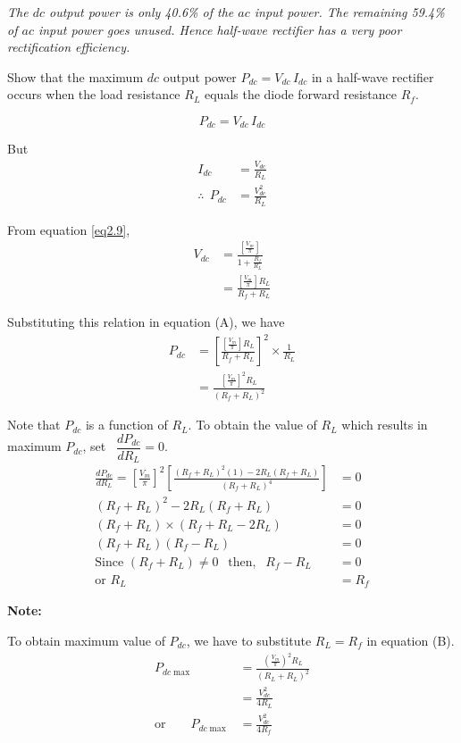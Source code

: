 {\em The $dc$ output power is only 40.6\% of the $ac$ input power. The
remaining 59.4\% of $ac$ input power goes unused. Hence half-wave
rectifier has a very poor rectification efficiency.}

\begin{example}\label{exam2.2}
Show that the maximum $dc$ output power $P_{dc} = V_{dc}\,I_{dc}$ in a
half-wave rectifier occurs when the load resistance $R_L$ equals the
diode forward resistance $R_f$.
\end{example}

\begin{solution}
$$
P_{dc} = V_{dc}\,I_{dc}
$$

But
\begin{align*}
I_{dc} & = \frac{V_{dc}}{R_L} \\[4pt]
\therefore ~~ P_{dc}  & = \frac{V^2_{dc}}{R_L} \tag{A}
\end{align*}

From equation \eqref{eq2.9},
\begin{align*}
V_{dc} & = \frac{\left[\frac{V_m}{\pi} \right]}{1+ \frac{R_f}{R_L}}\\[4pt]
& = \frac{\left[\frac{V_m}{\pi} \right]R_L}{R_f + R_L}
\end{align*}

Substituting this relation in equation (A), we have
\begin{align*}
P_{dc} & = \left[\frac{\left[\frac{V_m}{\pi} \right] R_L}{R_f+R_L}\right]^2 \times \frac{1}{R_L}\\
& = \frac{\left[\frac{V_m}{\pi} \right]^2 R_L}{(R_f + R_L)^2} \tag{B}
\end{align*}

Note that $P_{dc}$ is a function of $R_L$. To obtain the value of
$R_L$ which results in maximum $P_{dc}$, set~ $\dfrac{dP_{dc}}{dR_L} =0$.
\begin{align*}
\frac{dP_{dc}}{dR_L} = \left[\frac{V_m}{\pi} \right]^2
\left[\frac{(R_f + R_L)^2 (1) - 2 R_L (R_f + R_L)}{ (R_f + R_L)^4} \right]
& = 0\\[4pt]
(R_f + R_L)^2 - 2 R_L (R_f + R_L) & = 0 \\[4pt]
(R_f + R_L) \times (R_f + R_L - 2 R_L) & = 0\\[4pt]
(R_f + R_L) (R_f-R_L) & = 0\\[4pt]
\text{Since } (R_f + R_L) \neq 0 ~~ \text{ then, } ~~ R_f - R_L & = 0\\[4pt]
\text{or } R_L & = R_f \tag{C}
\end{align*}

\medskip
\noindent\textbf{Note:}

To obtain maximum value of $P_{dc}$, we have to substitute $R_L=R_f$
in equation (B).
\begin{align*}
P_{dc \max} & = \frac{\left(\frac{V_m}{\pi} \right)^2 R_L }{(R_L +
  R_L)^2}\\[4pt]
& = \frac{V^2_{dc}}{4R_{L}}\\[4pt]
\text{or}\qquad P_{dc \max} & = \frac{V^2_{dc}}{4 R_f} \tag{D}
\end{align*}
\end{solution}

